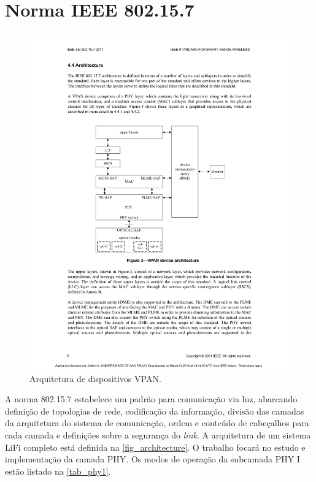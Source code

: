	\section{Norma IEEE 802.15.7}\label{sec-norma}
	\begin{figure}[htb]
		\caption{\label{fig_architecture}Arquitetura de dispositivos VPAN.}
		\centering
		\includegraphics[width=0.5\textheight,trim={5cm 9.6cm 5.3cm 7cm}, clip]{pag31.pdf}
	\end{figure}

	A norma 802.15.7 estabelece um padrão para comunicação via luz, abarcando definição de topologias de rede, codificação da informação, divisão das camadas da arquitetura do sistema de comunicação, ordem e conteúdo de cabeçalhos para cada camada e definições sobre a segurança do \textit{link}. A arquitetura de um sistema LiFi completo está definida na \autoref{fig_architecture}.
	O trabalho focará no estudo e implementação da camada PHY. Os modos de operação da subcamada PHY I estão listado na \autoref{tab_phy1}.

